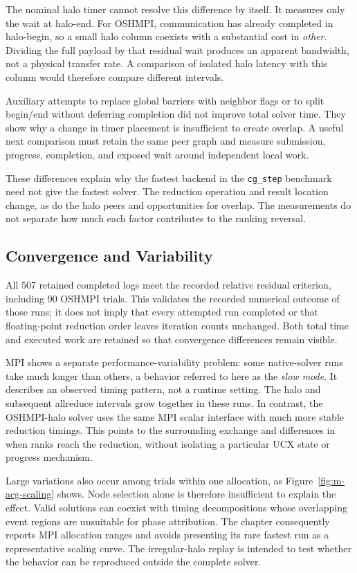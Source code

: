 The nominal halo timer cannot resolve this difference by itself. It measures only the wait at halo-end. For OSHMPI, communication has already completed in halo-begin, so a small halo column coexists with a substantial cost in \emph{other}. Dividing the full payload by that residual wait produces an apparent bandwidth, not a physical transfer rate. A comparison of isolated halo latency with this column would therefore compare different intervals.

Auxiliary attempts to replace global barriers with neighbor flags or to split begin/end without deferring completion did not improve total solver time. They show why a change in timer placement is insufficient to create overlap. A useful next comparison must retain the same peer graph and measure submission, progress, completion, and exposed wait around independent local work.

These differences explain why the fastest backend in the \texttt{cg\_step} benchmark need not give the fastest solver. The reduction operation and result location change, as do the halo peers and opportunities for overlap. The measurements do not separate how much each factor contributes to the ranking reversal.

\subsection{Convergence and Variability}\label{sec:acg-variability}

All 507 retained completed logs meet the recorded relative residual criterion, including 90 OSHMPI trials. This validates the recorded numerical outcome of those runs; it does not imply that every attempted run completed or that floating-point reduction order leaves iteration counts unchanged. Both total time and executed work are retained so that convergence differences remain visible.

MPI shows a separate performance-variability problem: some native-solver runs take much longer than others, a behavior referred to here as the \emph{slow mode}. It describes an observed timing pattern, not a runtime setting. The halo and subsequent allreduce intervals grow together in these runs. In contrast, the OSHMPI-halo solver uses the same MPI scalar interface with much more stable reduction timings. This points to the surrounding exchange and differences in when ranks reach the reduction, without isolating a particular UCX state or progress mechanism.

Large variations also occur among trials within one allocation, as Figure~\ref{fig:m-acg-scaling} shows. Node selection alone is therefore insufficient to explain the effect. Valid solutions can coexist with timing decompositions whose overlapping event regions are unsuitable for phase attribution. The chapter consequently reports MPI allocation ranges and avoids presenting its rare fastest run as a representative scaling curve. The irregular-halo replay is intended to test whether the behavior can be reproduced outside the complete solver.

